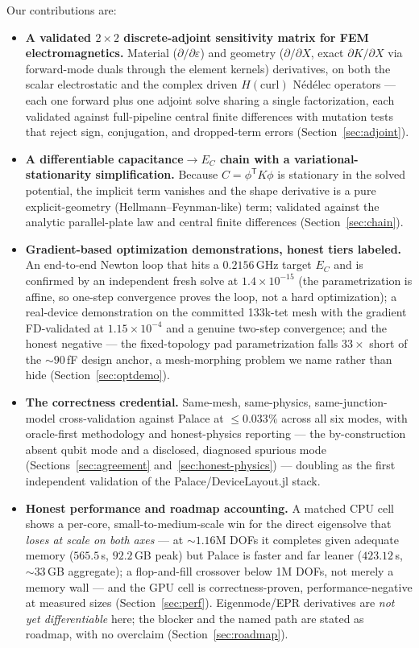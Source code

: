 \documentclass{anvil-paper}
\begin{document}
Our contributions are:
\begin{itemize}
  \item \textbf{A validated $2\times 2$ discrete-adjoint sensitivity
    matrix for FEM electromagnetics.} Material
    ($\partial/\partial\varepsilon$) and geometry ($\partial/\partial X$,
    exact $\partial K/\partial X$ via forward-mode duals through the
    element kernels) derivatives, on both the scalar electrostatic and
    the complex driven $H(\mathrm{curl})$ N\'ed\'elec operators --- each
    one forward plus one adjoint solve sharing a single factorization,
    each validated against full-pipeline central finite differences with
    mutation tests that reject sign, conjugation, and dropped-term errors
    (Section~\ref{sec:adjoint}).
  \item \textbf{A differentiable capacitance$\to E_C$ chain with a
    variational-stationarity simplification.} Because $C =
    \phi^{\mathsf{T}} K\phi$ is stationary in the solved potential, the
    implicit term vanishes and the shape derivative is a pure
    explicit-geometry (Hellmann--Feynman-like) term; validated against
    the analytic parallel-plate law and central finite differences
    (Section~\ref{sec:chain}).
  \item \textbf{Gradient-based optimization demonstrations, honest tiers
    labeled.} An end-to-end Newton loop that hits a $0.2156$\,GHz target
    $E_C$ and is confirmed by an independent fresh solve at
    $1.4\times 10^{-15}$ (the parametrization is affine, so one-step
    convergence proves the loop, not a hard optimization); a real-device
    demonstration on the committed 133k-tet mesh with the gradient
    FD-validated at $1.15\times 10^{-4}$ and a genuine two-step
    convergence; and the honest negative --- the fixed-topology pad
    parametrization falls $33\times$ short of the ${\sim}90$\,fF design
    anchor, a mesh-morphing problem we name rather than hide
    (Section~\ref{sec:optdemo}).
  \item \textbf{The correctness credential.} Same-mesh, same-physics,
    same-junction-model cross-validation against Palace at
    $\leq 0.033\%$ across all six modes, with oracle-first methodology
    and honest-physics reporting --- the by-construction absent qubit
    mode and a disclosed, diagnosed spurious mode
    (Sections~\ref{sec:agreement} and~\ref{sec:honest-physics}) ---
    doubling as the first independent validation of the
    Palace/DeviceLayout.jl stack.
  \item \textbf{Honest performance and roadmap accounting.} A matched
    CPU cell shows a per-core, small-to-medium-scale win for the direct
    eigensolve that \emph{loses at scale on both axes} --- at
    ${\sim}1.16$M DOFs it completes given adequate memory ($565.5$\,s,
    $92.2$\,GB peak) but Palace is faster and far leaner ($423.12$\,s,
    ${\sim}33$\,GB aggregate); a flop-and-fill crossover below 1M DOFs,
    not merely a memory wall --- and the GPU cell is correctness-proven,
    performance-negative at measured sizes (Section~\ref{sec:perf}).
    Eigenmode/EPR derivatives are \emph{not yet differentiable} here;
    the blocker and the named path are stated as roadmap, with no
    overclaim (Section~\ref{sec:roadmap}).
\end{itemize}
\end{document}
